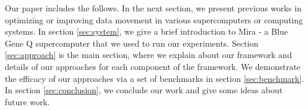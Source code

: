 Our paper includes the follows. In the next section, we present previous works in optimizing or improving data movement in various supercomputers or computing systems. In section \ref{sec:system}, we give a brief introduction to Mira - a Blue Gene Q supercomputer that we used to run our experiments. Section \ref{sec:approach} is the main section, where we explain about our framework and details of our approaches for each component of the framework. We demonstrate the efficacy of our approaches via a set of benchmarks in section \ref{sec:benchmark}. In section \ref{sec:conclusion}, we conclude our work and give some ideas about future work.
